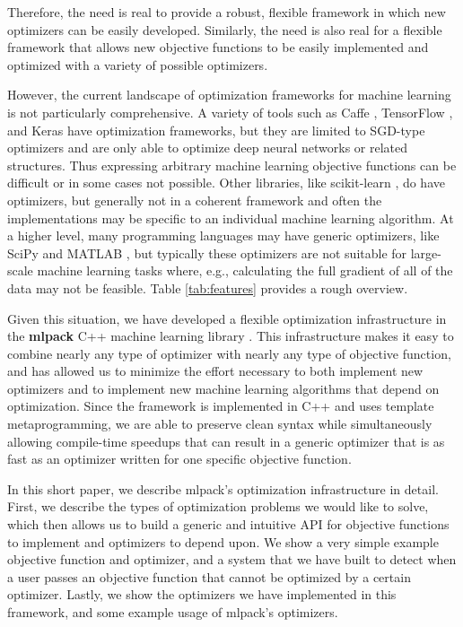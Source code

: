 \documentclass{article}
\begin{document}
Therefore, the need is real to provide a robust, flexible framework in which
new optimizers can be easily developed.  Similarly, the need is also real for a
flexible framework that allows new objective functions to be easily implemented
and optimized with a variety of possible optimizers.

However, the current landscape of optimization frameworks for machine learning
is not particularly comprehensive.  A variety of tools such as
Caffe \cite{jia2014caffe},
TensorFlow \cite{abadi2016tensorflow},
and
Keras \cite{chollet2015}
have optimization frameworks, but they are limited to SGD-type optimizers and
are only able to optimize deep neural networks or related structures.  Thus
expressing arbitrary machine learning objective functions can be difficult or in
some cases not possible.  Other libraries, like
scikit-learn \cite{pedregosa2011scikit},
do have optimizers, but generally not in a coherent framework and
often the implementations may be specific to an individual machine learning
algorithm.  At a higher level, many programming languages may have generic
optimizers, like SciPy \cite{jones2014scipy} and MATLAB \cite{mathworks2017OTB}, but typically these
optimizers are not suitable for large-scale machine learning tasks where, e.g.,
calculating the full gradient of all of the data may not be feasible.  Table
\ref{tab:features} provides a rough overview.

Given this situation, we have developed a flexible optimization infrastructure
in the {\bf mlpack} C++ machine learning library \cite{mlpack2013}.  This
infrastructure makes it easy to combine nearly any type of optimizer with nearly
any type of objective function, and has allowed us to minimize the effort
necessary to both implement new optimizers and to implement new machine learning
algorithms that depend on optimization.  Since the framework is implemented in
C++ and uses template metaprogramming, we are able to preserve clean syntax
while simultaneously allowing compile-time speedups that can result in a
generic optimizer that is as fast as an optimizer written for one specific
objective function.

In this short paper, we describe mlpack's optimization infrastructure in detail.
First, we describe the types of optimization problems we would like to solve,
which then allows us to build a generic and intuitive API for objective
functions to implement and optimizers to depend upon.  We show a very simple
example objective function and optimizer, and a system that we have built to
detect when a user passes an objective function that cannot be optimized by a
certain optimizer.  Lastly, we show the optimizers we have implemented in this
framework, and some example usage of mlpack's optimizers.
\end{document}
